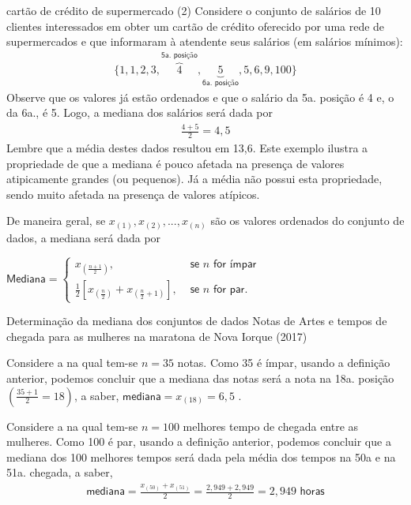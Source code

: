 \begin{example}{cartão de crédito de supermercado (2)}
Considere o conjunto de salários de 10 clientes interessados em obter um cartão de crédito oferecido por uma rede de supermercados e que informaram à atendente seus salários (em salários mínimos):
\begin{equation*}
\begin{split}\{1, 1, 2, 3, \overbrace{4}^{\textsf{5a. posição}}, \underbrace{5}_{\textsf{6a. posição}}, 5, 6, 9, 100\}\end{split}
\end{equation*}
Observe que os valores já estão ordenados e que o salário da 5a. posição é 4 e, o da 6a., é 5. Logo, a mediana dos salários será dada por
\begin{equation*}
\begin{split}\frac{4+5}{2}=4,5\end{split}
\end{equation*}
Lembre que a média destes dados resultou em 13,6. Este exemplo ilustra a propriedade de que a mediana é pouco afetada na presença de valores atipicamente grandes (ou pequenos). Já a média não possui esta propriedade, sendo muito afetada na presença de valores atípicos.
\end{example}

De maneira geral, se \(x_{(1)},x_{(2)},...,x_{(n)}\) são os valores ordenados do conjunto de dados, a mediana será dada por

\(\textsf{Mediana}=\left \{ \begin{array}{lr}
x_{\left (\frac{n+1}{2}\right )}, &\textsf{ se }n \textsf{ for ímpar}\\
\frac{1}{2} [ x_{\left (\frac{n}{2}\right )}+x_{\left (\frac{n}{2}+1\right )} ], &\textsf{ se }n \textsf{ for par.}\end{array}\right.\)

\begin{example}{Determinação da mediana dos conjuntos de dados Notas de Artes e tempos de chegada para as mulheres na maratona de Nova Iorque (2017)}

Considere a  na qual tem-se \(n=35\) notas. Como 35 é ímpar, usando a definição anterior, podemos concluir que a mediana das notas será a nota na 18a. posição \(\left (\frac{35+1}{2}=18\right )\), a saber, \(\textsf{mediana}=x_{(18)}=6,5\) .

Considere a  na qual tem-se \(n=100\) melhores tempo de chegada entre as mulheres. Como 100 é par, usando a definição anterior, podemos concluir que a mediana dos 100 melhores tempos será dada pela média dos tempos na 50a e na 51a. chegada, a saber,
\begin{equation*}
\begin{split}\textsf{mediana}=\frac{x_{(50)}+x_{(51)}}{2}=\frac{2,949+2,949}{2}=2,949 \textsf{ horas}\end{split}
\end{equation*}
\end{example}

